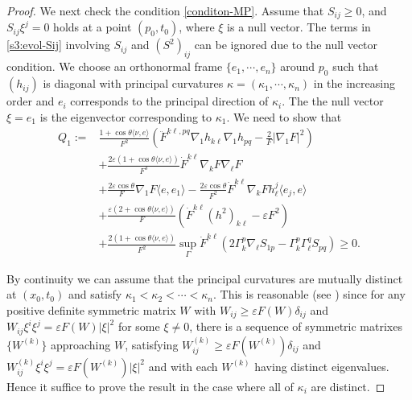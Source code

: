 \documentclass[11pt,reqno]{amsart}
\theoremstyle{definition}
\theoremstyle{remark}
\numberwithin{equation}{section}
\renewcommand{\(}{\left(}
\renewcommand{\)}{\right)}
\renewcommand{\-}{\overline}
\newcommand{\e}{\varepsilon}
\renewcommand{\t}{\theta}
\newcommand{\G}{\Gamma}
\begin{document}
\begin{proof}
We next check the condition \eqref{conditon-MP}. Assume that $S_{ij}\geq 0$, and $S_{ij}\xi^j=0$ holds at a point $(p_0,t_0)$, where $\xi$ is a null vector. The terms in \eqref{s3:evol-Sij} involving $S_{ij}$ and $(S^2)_{ij}$ can be ignored due to the null vector condition.  We choose an orthonormal frame $\{e_1,\cdots, e_n\}$ around $p_0$ such that $(h_{ij})$ is diagonal with principal curvatures $\kappa=(\kappa_1,\cdots,\kappa_n)$ in the increasing order and $e_i$ corresponds to the principal direction of $\kappa_i$. The the null vector $\xi=e_1$ is the eigenvector corresponding to $\kappa_1$. We need to show that
    \begin{align}\label{s4:key-ineq-1}
    Q_1:=&\frac{1+\cos\t\langle \nu,e\rangle}{F^2}\(\ddot{F}^{k\ell,pq}\nabla_1 h_{k\ell}\nabla_1 h_{pq}-\frac{2}{F}|\nabla_1F|^2\)\nonumber\\
    &+\frac{2\varepsilon\left(1+\cos\theta\langle\nu,e\rangle\right)}{F^3}\dot{F}^{k\ell}\nabla_kF\nabla_\ell F\nonumber\\
    &+\frac{2\varepsilon\cos\t}{F}\nabla_1 F \langle e,e_1\rangle-\frac{2\varepsilon\cos\t}{F^2}\dot{F}^{k\ell}\nabla_k F h_\ell^j\langle e_j,e\rangle\nonumber\\
    &+\frac{\e(2+\cos\t\langle \nu,e\rangle)}{F}\left(\dot{F}^{k\ell}(h^2)_{k\ell}-\e F^2\right)\nonumber\\
    &+\frac{2(1+\cos\t\langle \nu,e\rangle)}{F^2}\sup_{\G}\dot{F}^{k\ell}(2\G_k^p \nabla_\ell S_{1p}-\G_k^p\G_\ell^qS_{pq})\geq 0.
    \end{align}

By continuity we can assume that the principal curvatures are mutually distinct at $(x_0,t_0)$ and satisfy $\kappa_1<\kappa_2<\cdots<\kappa_n$. This is reasonable (see \cite[p.30]{And2007}) since for any positive definite symmetric matrix $W$ with $W_{ij}\geq \varepsilon F(W)\delta_{ij}$ and $W_{ij}\xi^i\xi^j=\varepsilon F(W)|\xi|^2$ for some $\xi\neq 0$, there is a sequence of symmetric matrixes $\{W^{(k)}\}$ approaching $W$, satisfying $W^{(k)}_{ij}\geq \varepsilon F(W^{(k)})\delta_{ij}$ and $W^{(k)}_{ij}\xi^i\xi^j=\varepsilon F(W^{(k)})|\xi|^2$ and with each $W^{(k)}$ having distinct eigenvalues. Hence it suffice to prove the result in the case where all of $\kappa_i$ are distinct.


\end{proof}
\end{document}
